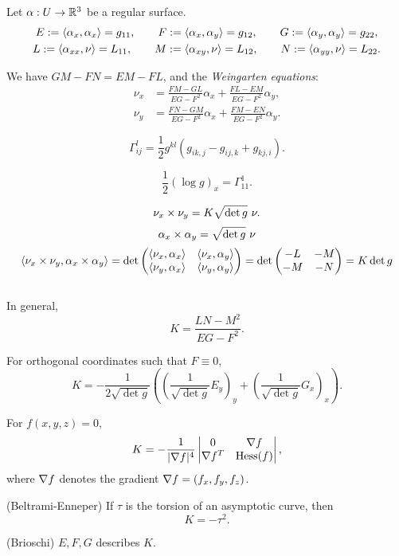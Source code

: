\documentclass{../exp}
\def\a{\alpha}
\begin{document}
\begin{defn}
Let $\a:U\to\R^3$ be a regular surface.
\begin{gather*}
E:=\<\a_x,\a_x\>=g_{11},\qquad F:=\<\a_x,\a_y\>=g_{12},\qquad G:=\<\a_y,\a_y\>=g_{22},\\
L:=\<\a_{xx},\nu\>=L_{11},\qquad M:=\<\a_{xy},\nu\>=L_{12},\qquad N:=\<\a_{yy},\nu\>=L_{22}.
\end{gather*}
\end{defn}


\begin{cor}
We have $GM-FN=EM-FL$, and the \emph{Weingarten equations}:
\begin{align*}
\nu_x&=\frac{FM-GL}{EG-F^2}\a_x+\frac{FL-EM}{EG-F^2}\a_y,\\
\nu_y&=\frac{FN-GM}{EG-F^2}\a_x+\frac{FM-EN}{EG-F^2}\a_y.
\end{align*}
\end{cor}



\begin{thm}
\[\Gamma_{ij}^l=\frac12g^{kl}(g_{ik,j}-g_{ij,k}+g_{kj,i}).\]
\end{thm}

\[\frac12(\log g)_x=\Gamma_{11}^1.\]

\[\nu_x\x\nu_y=K\sqrt{\det g}\ \nu.\]
\[\a_x\x\a_y=\sqrt{\det g}\ \nu\]
\[\<\nu_x\x\nu_y,\a_x\x\a_y\>=\det\mat{\<\nu_x,\a_x\>&\<\nu_x,\a_y\>\\\<\nu_y,\a_x\>&\<\nu_y,\a_y\>}=\det\mat{-L&-M\\-M&-N}=K\det g\]











\begin{thm}
$ $\\[-12pt]
\begin{cond}
\item
In general,
\[K=\frac{LN-M^2}{EG-F^2}.\]
\item
For orthogonal coordinates such that $F\equiv0$,
\[K=-\frac1{2\sqrt{\det g}}\left((\frac1{\sqrt{\det g}}E_y)_y+(\frac1{\sqrt{\det g}}G_x)_x\right).\]
\item
For $f(x,y,z)=0$,
\[K=-\frac1{|\del f|^4}\mat[v]{0&\del f\\\del f^T&\Hess(f)},\]
where $\del f$ denotes the gradient $\del f=(f_x,f_y,f_z)$.
\item(Beltrami-Enneper) If $\tau$ is the torsion of an asymptotic curve, then
\[K=-\tau^2.\]
\item(Brioschi) $E,F,G$ describes $K$.
\end{cond}
\end{thm}
\end{document}
